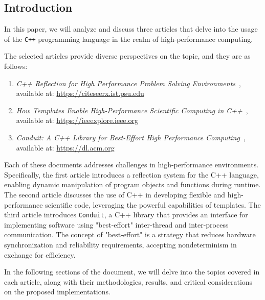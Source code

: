 \documentclass[11pt]{article}
\begin{document}
\begin{multicols*}{2}[\columnsep=1cm]
    
    \section{Introduction}
    In this paper, we will analyze and discuss three articles that delve into the usage of the \texttt{C++} programming language in the realm of high-performance computing.

    The selected articles provide diverse perspectives on the topic, and they are as follows:
    \begin{enumerate}
        \item \textit{C++ Reflection for High Performance Problem Solving Environments}~\cite{Article1}, available at: \href{https://citeseerx.ist.psu.edu/document?repid=rep1&type=pdf&doi=2058bb40e6b80504ba1084452fd9c126cd19f891}{https://citeseerx.ist.psu.edu}
        \item \textit{How Templates Enable High-Performance Scientific Computing in C++}~\cite{Article2}, available at: \href{https://ieeexplore.ieee.org/abstract/document/774843?casa_token=YqZfo7t12KoAAAAA:aUt-msPVNEAtzfVwO4h_-R_r7IPTFs7vHYHbAtsOdDE83PlNvB8gkNl5maWpHYBU5QkS3cUp0R8}{https://ieeexplore.ieee.org}
        \item \textit{Conduit: A C++ Library for Best-Effort High Performance Computing}~\cite{Article3}, available at: \href{https://dl.acm.org/doi/abs/10.1145/3449726.3463205}{https://dl.acm.org}
    \end{enumerate}

    Each of these documents addresses challenges in high-performance environments. Specifically, the first article introduces a reflection system for the C++ language, enabling dynamic manipulation of program objects and functions during runtime. The second article discusses the use of C++ in developing flexible and high-performance scientific code, leveraging the powerful capabilities of templates. The third article introduces \texttt{Conduit}, a C++ library that provides an interface for implementing software using "best-effort" inter-thread and inter-process communication. The concept of "best-effort" is a strategy that reduces hardware synchronization and reliability requirements, accepting nondeterminism in exchange for efficiency.

    In the following sections of the document, we will delve into the topics covered in each article, along with their methodologies, results, and critical considerations on the proposed implementations.


\end{multicols*}
\end{document}
